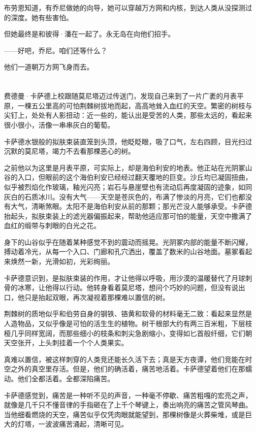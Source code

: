 \documentclass[AutoFakeBold=true]{book}
\begin{document}
布劳恩知道，有乔尼做她的向导，她可以穿越万方网和内核，到达人类从没探测过的深度。她有些害怕。

但她最终是和彼得·潘在一起了。永无岛在向他们招手。

{\kaishu ——好吧，乔尼。咱们还等什么？}

他们一道朝万方网飞身而去。

\chapter{}

费德曼·卡萨德上校跟随莫尼塔迈过传送门，发现自己来到了一片广袤的月表平原，一棵五公里高的可怕荆棘树拔地而起，高高地耸入血红的天空。繁密的树枝与尖钉上，处处有人影扭动：近一些的，能认出是受苦的人类，那些太远的，看起来很小很小，活像一串串灰白的葡萄。

卡萨德水银般的拟肤束装直笼到头顶，他眨眨眼，吸了口气，左右四顾，目光扫过沉默的莫尼塔，竭力不去看那棵恶心的树。

之前他以为这里是月表平原，可实际上，却是海伯利安的地表。他正站在光阴冢山谷的入口，但眼前的这个海伯利安已经经过翻天覆地的巨变。沙丘均已凝固扭曲，似乎被烈焰化作玻璃，釉光闪亮；岩石与悬崖壁也有流动后再度凝固的迹象，如同灰白的石质冰川。没有大气——天空是苍灰色的，布满了惨淡的月亮，它们也都没有大气，清晰煞眼。太阳不是海伯利安从前的那颗；那光芒没人能够承受。卡萨德抬起头，拟肤束装上的滤光器偏振起来，帮助他适应那可怕的能量，天空中撒满了血红的缎带与刺眼的白光之花。

身下的山谷似乎在随着某种感觉不到的震动而摇晃。光阴冢内部的能量不断闪耀，搏动着冷光，从每一个入口、门廊和孔穴洒出，覆盖了数米的山谷地面。墓冢看起来焕然一新，光滑如初，光彩绚丽。

卡萨德意识到，是拟肤束装的作用，才让他得以呼吸，用沙漠的温暖替代了月球刺骨的冰寒，让他得以行动。他转身看着莫尼塔，想问个巧妙的问题，但没有说出口，他只是抬起双眼，再次凝视着那棵难以置信的树。

荆棘树的质地似乎和伯劳自身的钢铁、铬黄和软骨的材料毫无二致：看起来显然是人造物品，又似乎像是可怕的活生生的植物。树干根部大约有两三百米粗，下层枝桠几乎同样宽阔，而那些细小的枝条和刺尖急剧缩小，变得如匕首般纤细，它们朝天空张开，上头刺挂着一个个人类果实。

真难以置信，被这样刺穿的人类竞还能长久活下去；真是天方夜谭，他们竞能在时空之外的真空里存活。但是，他们的确活着，痛苦地活着。卡萨德望着他们在那蠕动。他们全都活着。全都深陷痛苦。

卡萨德感觉到，痛苦是一种听不见的声音，一种毫不停歇、痛苦粗嘎的宏亮之声，就像是几千只不懂音律的手指砸在了上千个琴键上，奏出响亮的痛苦之管风琴曲。当他细看燃烧的天空，痛苦似乎仅凭肉眼就能望到，那棵树像是火葬柴堆，或是巨大的灯塔，一波波痛苦涌起，清晰可见。
\end{document}
